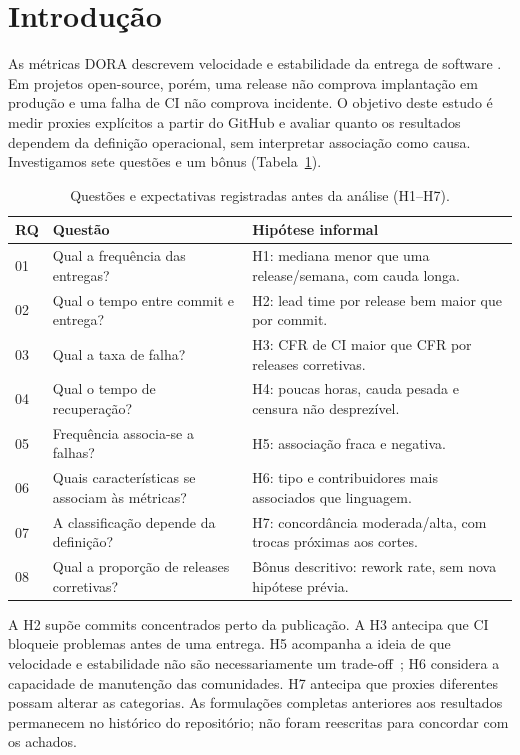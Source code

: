 \section{Introdução}

As métricas DORA descrevem velocidade e estabilidade da entrega de software
\cite{forsgren2018accelerate,dora}. Em projetos open-source, porém, uma release não
comprova implantação em produção e uma falha de CI não comprova incidente. O objetivo
deste estudo é medir proxies explícitos a partir do GitHub e avaliar quanto os
resultados dependem da definição operacional, sem interpretar associação como causa.
Investigamos sete questões e um bônus (Tabela~\ref{tab:questoes}).

\begin{table}[htbp]
\centering\footnotesize
\caption{Questões e expectativas registradas antes da análise (H1--H7).}
\label{tab:questoes}
\begin{tabular}{p{}p{}p{}}
\hline
RQ & Questão & Hipótese informal \\
\hline
01 & Qual a frequência das entregas? & H1: mediana menor que uma release/semana, com cauda longa. \\
02 & Qual o tempo entre commit e entrega? & H2: lead time por release bem maior que por commit. \\
03 & Qual a taxa de falha? & H3: CFR de CI maior que CFR por releases corretivas. \\
04 & Qual o tempo de recuperação? & H4: poucas horas, cauda pesada e censura não desprezível. \\
05 & Frequência associa-se a falhas? & H5: associação fraca e negativa. \\
06 & Quais características se associam às métricas? & H6: tipo e contribuidores mais associados que linguagem. \\
07 & A classificação depende da definição? & H7: concordância moderada/alta, com trocas próximas aos cortes. \\
08 & Qual a proporção de releases corretivas? & Bônus descritivo: rework rate, sem nova hipótese prévia. \\
\hline
\end{tabular}
\end{table}

A H2 supõe commits concentrados perto da publicação. A H3 antecipa que CI bloqueie
problemas antes de uma entrega. H5 acompanha a ideia de que velocidade e estabilidade
não são necessariamente um trade-off~\cite{doraMetricas}; H6 considera a capacidade
de manutenção das comunidades. H7 antecipa que proxies diferentes possam alterar as
categorias. As formulações completas anteriores aos resultados permanecem no
histórico do repositório; não foram reescritas para concordar com os achados.
